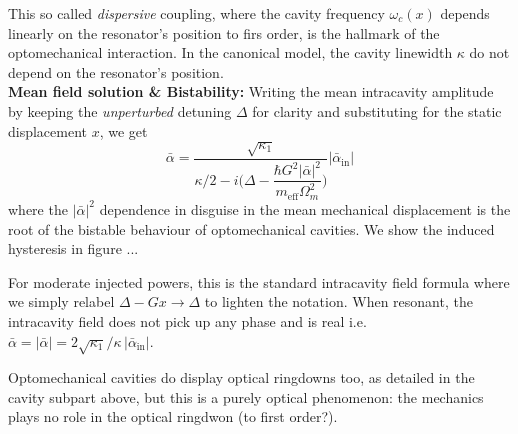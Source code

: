 This so called \textit{dispersive} coupling, where the cavity frequency $\omega_c(x)$ depends linearly on the resonator's position to firs order, is the hallmark of the optomechanical interaction. In the canonical model, the cavity linewidth $\kappa$ do not depend on the resonator's position. \\

\noindent \textbf{Mean field solution \& Bistability:}
Writing the mean intracavity amplitude by keeping the \textit{unperturbed} detuning $\Delta$ for clarity and substituting for the static displacement $x$, we get
\begin{equation}
  \bar{\alpha} = \frac{\sqrt{\kappa_1}}{ \kappa/2 - i \Big( \Delta - \dfrac{\hbar G^2  |\bar{\alpha}|^2}{m_{\text{eff}} \Omega_m^2 } \Big)} |\bar{\alpha}_{\text{in}}|
\end{equation}
where the $|\bar{\alpha}|^2$ dependence in disguise in the mean mechanical displacement is the root of the bistable behaviour of optomechanical cavities. We show the induced hysteresis in figure ... 

For moderate injected powers, this is the standard intracavity field formula where we simply relabel $\Delta - Gx \rightarrow \Delta$ to lighten the notation. When resonant, the intracavity field does not pick up any phase and is real i.e. $\bar{\alpha} = |\bar{\alpha}| = 2\sqrt{\kappa_1}/\kappa \, |\bar{\alpha}_{\mathrm{in}}|$. 

Optomechanical cavities do display optical ringdowns too, as detailed in the cavity subpart above, but this is a purely optical phenomenon: the mechanics plays no role in the optical ringdwon (to first order?). \\



